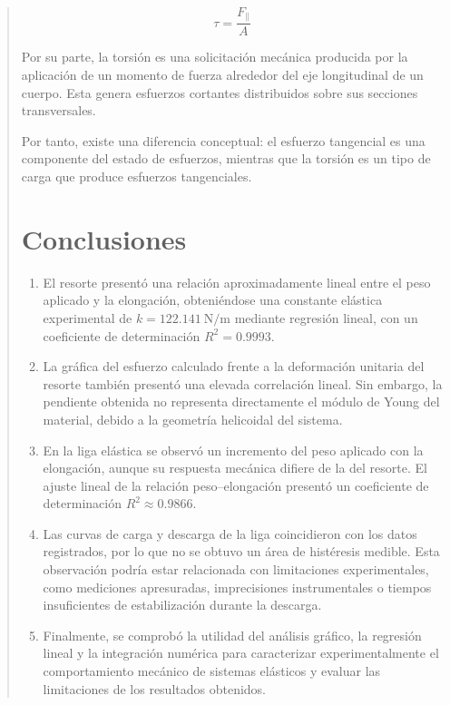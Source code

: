 \documentclass[11pt,a4paper]{article}
\begin{document}
\begin{quote}
\begin{equation}
    \boxed{\tau=\frac{F_{\parallel}}{A}}
\end{equation}

Por su parte, la torsión es una solicitación mecánica
producida por la aplicación de un momento de fuerza
alrededor del eje longitudinal de un cuerpo.
Esta genera esfuerzos cortantes distribuidos
sobre sus secciones transversales.

Por tanto, existe una diferencia conceptual:
el esfuerzo tangencial es una componente del estado
de esfuerzos, mientras que la torsión es un tipo
de carga que produce esfuerzos tangenciales.

\newpage
\section{Conclusiones}

\begin{enumerate}
    \item El resorte presentó una relación aproximadamente
    lineal entre el peso aplicado y la elongación,
    obteniéndose una constante elástica experimental
    de $k=122.141\ \mathrm{N/m}$ mediante regresión
    lineal, con un coeficiente de determinación
    $R^2=0.9993$.

    \item La gráfica del esfuerzo calculado frente
    a la deformación unitaria del resorte también
    presentó una elevada correlación lineal.
    Sin embargo, la pendiente obtenida no representa
    directamente el módulo de Young del material,
    debido a la geometría helicoidal del sistema.

    \item En la liga elástica se observó un incremento
    del peso aplicado con la elongación, aunque
    su respuesta mecánica difiere de la del resorte.
    El ajuste lineal de la relación peso--elongación
    presentó un coeficiente de determinación
    $R^2\approx0.9866$.

    \item Las curvas de carga y descarga de la liga
    coincidieron con los datos registrados, por lo
    que no se obtuvo un área de histéresis medible.
    Esta observación podría estar relacionada con
    limitaciones experimentales, como mediciones
    apresuradas, imprecisiones instrumentales
    o tiempos insuficientes de estabilización
    durante la descarga.

    \item Finalmente, se comprobó la utilidad
    del análisis gráfico, la regresión lineal
    y la integración numérica para caracterizar
    experimentalmente el comportamiento mecánico
    de sistemas elásticos y evaluar las limitaciones
    de los resultados obtenidos.
\end{enumerate}


\end{quote}
\end{document}
